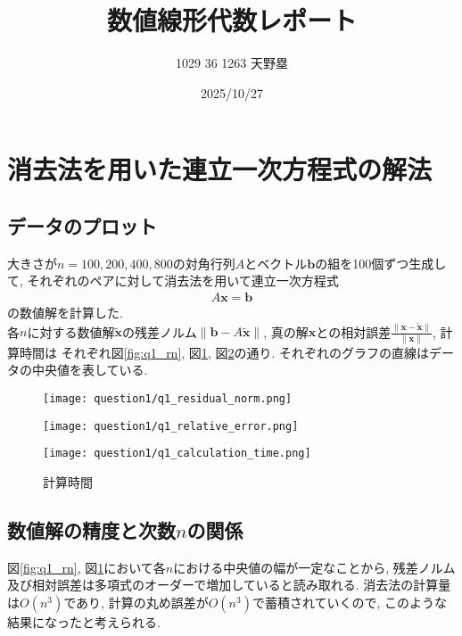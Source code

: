 \documentclass[uplatex,a4j]{jsarticle}
\title{数値線形代数レポート}
\author{1029 36 1263 天野塁}
\date{2025/10/27}
\begin{document}
\maketitle

\section{消去法を用いた連立一次方程式の解法}
\label{sec:q1}

\subsection{データのプロット}
\label{sec:q1_1}

大きさが$n = 100,200,400,800$の対角行列$A$とベクトル$\bm{b}$の組を100個ずつ生成して, 
それぞれのペアに対して消去法を用いて連立一次方程式
\begin{align}
  A \bm{x} = \bm{b}
\end{align}
の数値解を計算した. \\
各$n$に対する数値解$\bm{\tilde{x}}$の残差ノルム$\| \bm{b} - A \bm{\tilde{x}} \|$, 
真の解$\bm{x}$との相対誤差$\frac{\| \bm{x} - \bm{\tilde{x}} \|}{\| \bm{x} \|}$, 計算時間は
それぞれ図\ref{fig:q1_rn}, 図\ref{fig:q1_re}, 図\ref{fig:q1_ct}の通り. 
それぞれのグラフの直線はデータの中央値を表している.

\begin{figure}[htbp]
  \centering

  \begin{minipage}[t]{0.48\textwidth}
    \centering
    \texttt{[image: question1/q1\_residual\_norm.png]}
    \label{fig:q1_rn}
  \end{minipage}
  \hfill
  \begin{minipage}[t]{0.48\textwidth}
    \centering
    \texttt{[image: question1/q1\_relative\_error.png]}
    \label{fig:q1_re}
  \end{minipage}
  
\end{figure}

\begin{figure}[ht]
  \centering
  \texttt{[image: question1/q1\_calculation\_time.png]}
  \caption{計算時間}
  \label{fig:q1_ct}
\end{figure}

\newpage
\subsection{数値解の精度と次数$n$の関係}
\label{sec:q1_2}
図\ref{fig:q1_rn}, 図\ref{fig:q1_re}において各$n$における中央値の幅が一定なことから, 
残差ノルム及び相対誤差は多項式のオーダーで増加していると読み取れる. 
消去法の計算量は$O(n^3)$であり, 計算の丸め誤差が$O(n^3)$で蓄積されていくので, このような結果になったと考えられる.
\end{document}
